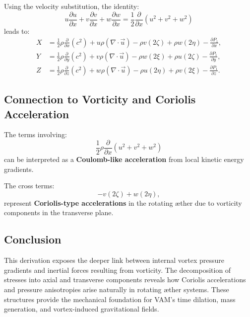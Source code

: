 \documentclass[12pt]{article}
\begin{document}
    Using the velocity substitution, the identity:
    \[
        u \frac{\partial u}{\partial x} + v \frac{\partial v}{\partial x} + w \frac{\partial w}{\partial x} = \frac{1}{2} \frac{\partial}{\partial x}(u^2 + v^2 + w^2)
    \]
    leads to:
    \begin{align}
        X &= \frac{1}{2} \rho \frac{\partial}{\partial x}(c^2)
        + u \rho (\nabla \cdot \vec{u})
        - \rho v (2 \zeta) + \rho w (2 \eta)
        - \frac{\partial P_1}{\partial x}, \\
        Y &= \frac{1}{2} \rho \frac{\partial}{\partial y}(c^2)
        + v \rho (\nabla \cdot \vec{u})
        - \rho w (2 \xi) + \rho u (2 \zeta)
        - \frac{\partial P_1}{\partial y}, \\
        Z &= \frac{1}{2} \rho \frac{\partial}{\partial z}(c^2)
        + w \rho (\nabla \cdot \vec{u})
        - \rho u (2 \eta) + \rho v (2 \xi)
        - \frac{\partial P_1}{\partial z}.
    \end{align}

    \subsection{Connection to Vorticity and Coriolis Acceleration}
    The terms involving:
    \begin{equation}
        \frac{1}{2} \rho \frac{\partial}{\partial x} (u^2 + v^2 + w^2)
    \end{equation}
    can be interpreted as a \textbf{Coulomb-like acceleration} from local kinetic energy gradients.

    The cross terms:
    \begin{equation}
        - v (2 \zeta) + w (2 \eta),
    \end{equation}
    represent \textbf{Coriolis-type accelerations} in the rotating æther due to vorticity components in the transverse plane.

    \subsection*{Conclusion}
    This derivation exposes the deeper link between internal vortex pressure gradients and inertial forces resulting from vorticity. The decomposition of stresses into axial and transverse components reveals how Coriolis accelerations and pressure anisotropies arise naturally in rotating æther systems. These structures provide the mechanical foundation for VAM’s time dilation, mass generation, and vortex-induced gravitational fields.
\end{document}
